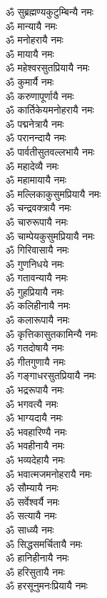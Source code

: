 \begin{flushleft}
\begin{multicols}{2}
ॐ सुब्रह्मण्यकुटुम्बिन्यै नमः\\
ॐ मान्यायै नमः\\
ॐ मनोहरायै नमः\\
ॐ मायायै नमः\\
ॐ महेश्वरसुतप्रियायै नमः\\
ॐ कुमार्यै नमः\\
ॐ करुणापूर्णायै नमः\\
ॐ कार्तिकेयमनोहरायै नमः\\
ॐ पद्मनेत्रायै नमः\\
ॐ परानन्दायै नमः\hfill{}\\
ॐ पार्वतीसुतवल्लभायै नमः\\
ॐ महादेव्यै नमः\\
ॐ महामायायै नमः\\
ॐ मल्लिकाकुसुमप्रियायै नमः\\
ॐ चन्द्रवक्त्रायै नमः\\
ॐ चारुरूपायै नमः\\
ॐ चाम्पेयकुसुमप्रियायै नमः\\
ॐ गिरिवासायै नमः\\
ॐ गुणनिधये नमः\\
ॐ गतावन्यायै नमः\hfill{}\\
ॐ गुहप्रियायै नमः\\
ॐ कलिहीनायै नमः\\
ॐ कलारूपायै नमः\\
ॐ कृत्तिकासुतकामिन्यै नमः\\
ॐ गतदोषायै नमः\\
ॐ गीतगुणायै नमः\\
ॐ गङ्गाधरसुतप्रियायै नमः\\
ॐ भद्ररूपायै नमः\\
ॐ भगवत्यै नमः\\
ॐ भाग्यदायै नमः\hfill{}\\
ॐ भवहारिण्यै नमः\\
ॐ भवहीनायै नमः\\
ॐ भव्यदेहायै नमः\\
ॐ भवात्मजमनोहरायै नमः\\
ॐ सौम्यायै नमः\\
ॐ सर्वेश्वर्यै नमः\\
ॐ सत्यायै नमः\\
ॐ साध्व्यै नमः\\
ॐ सिद्धसमर्चितायै नमः\\
ॐ हानिहीनायै नमः\hfill{}\\
ॐ हरिसुतायै नमः\\
ॐ हरसूनुमनःप्रियायै नमः\\

\end{multicols}
\end{flushleft}

